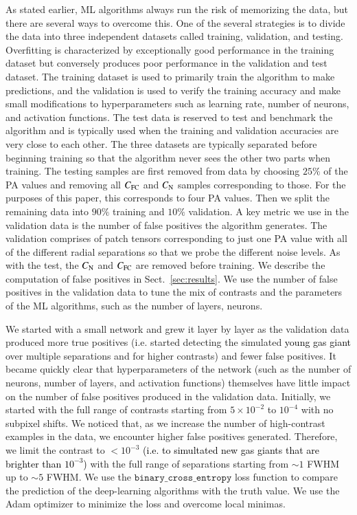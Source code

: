 \documentclass{aa}
\newcommand{\newchange}[1]{\textcolor{black}{#1}}
\begin{document}
As stated earlier, ML algorithms always run the risk of memorizing the data, but there are several ways to overcome this.
One of the several strategies is to divide the data into three independent datasets called training, validation, and testing.
Overfitting is characterized by exceptionally good performance in the training dataset but conversely produces poor performance in the validation and test dataset.
The training dataset is used to primarily train the algorithm to make predictions, and the validation is used to verify the training accuracy and make small modifications to hyperparameters such as learning rate, number of neurons, and activation functions. %
The test data is reserved to test and benchmark the algorithm and is typically used when the training and validation accuracies are very close to each other.
The three datasets are typically separated before beginning training so that the algorithm never sees the other two parts when training.
The testing samples are first removed from data by choosing $25\%$ of the PA values and removing all $C_{\rm FC}$ and $C_{\rm N}$ samples corresponding to those. 
For the purposes of this paper, this corresponds to four PA values.
Then we split the remaining data into $90\%$ training and $10\%$ validation.
A key metric we use in the validation data is the number of false positives the algorithm generates. 
The validation comprises of patch tensors corresponding to just one PA value with all of the different radial separations so that we probe the different noise levels.
As with the test, the $C_{\rm N}$ and $C_{\rm FC}$ are removed before training.
We describe the computation of false positives in Sect.~\ref{sec:results}.
We use the number of false positives in the validation data to tune the mix of contrasts and the parameters of the ML algorithms, such as the  number of layers, neurons.

We started with a small network and grew it layer by layer as the validation data produced more true positives (i.e. started detecting the simulated \newchange{young gas giant} over multiple separations and for higher contrasts) and fewer false positives.
It became quickly clear that hyperparameters of the network (such as the  number of neurons, number of layers, and activation functions) themselves have little impact on the number of false positives produced in the validation data.
Initially, we started with the full range of contrasts starting from $5\times10^{-2}$ to $10^{-4}$ with no subpixel shifts.
We noticed that, as we increase the number of high-contrast examples in the data, we encounter higher false positives generated. Therefore, we limit the contrast to $<10^{-3}$ \newchange{(i.e. to simultated new gas giants that are brighter than $10^{-3}$)} with the full range of separations starting from $\sim 1$ FWHM up to $\sim 5$ FWHM.
We use the $\texttt{binary\_cross\_entropy}$ loss function \citep{1993Li} to compare the prediction of the deep-learning algorithms with the truth value.
We use the Adam optimizer \citep{2014Adam} to minimize the loss and overcome local minimas.
\end{document}
